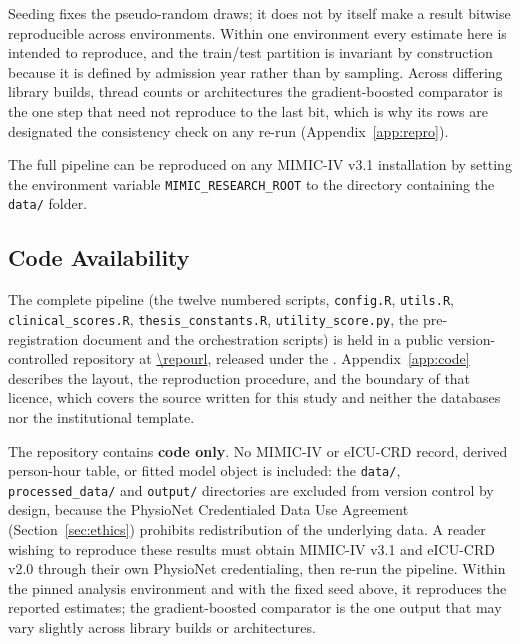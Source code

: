 Seeding fixes the pseudo-random draws; it does not by itself make a result
bitwise reproducible across environments. Within one environment every estimate
here is intended to reproduce, and the train/test partition is invariant by
construction because it is defined by admission year rather than by sampling.
Across differing library builds, thread counts or architectures the
gradient-boosted comparator is the one step that need not reproduce to the last
bit, which is why its rows are designated the consistency check on any re-run
(Appendix~\ref{app:repro}).

The full pipeline can be reproduced on any MIMIC-IV v3.1 installation by
setting the environment variable \texttt{MIMIC\_RESEARCH\_ROOT} to the
directory containing the \texttt{data/} folder.

\subsection{Code Availability}
\label{sec:code_availability}

The complete pipeline (the twelve numbered scripts, \texttt{config.R},
\texttt{utils.R}, \texttt{clinical\_scores.R}, \texttt{thesis\_constants.R},
\texttt{utility\_score.py}, the pre-registration document and the orchestration
scripts) is held in a public version-controlled repository at
\url{\repourl}, released under the \repolicence. Appendix~\ref{app:code}
describes the layout, the reproduction procedure, and the boundary of that
licence, which covers the source written for this study and neither the
databases nor the institutional template.

The repository contains \textbf{code only}. No MIMIC-IV or eICU-CRD record,
derived person-hour table, or fitted model object is included: the
\texttt{data/}, \texttt{processed\_data/} and \texttt{output/} directories are
excluded from version control by design, because the PhysioNet Credentialed
Data Use Agreement (Section~\ref{sec:ethics}) prohibits redistribution of the
underlying data. A reader wishing to reproduce these results must obtain
MIMIC-IV v3.1 and eICU-CRD v2.0 through their own PhysioNet credentialing, then
re-run the pipeline. Within the pinned analysis environment and with the fixed
seed above, it reproduces the reported estimates; the gradient-boosted
comparator is the one output that may vary slightly across library builds or
architectures.
